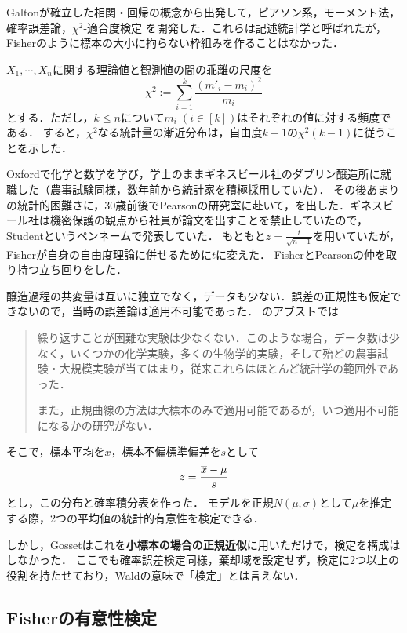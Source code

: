 \documentclass[uplatex,dvipdfmx]{jsreport}
\begin{document}
\begin{history}
    Galtonが確立した相関・回帰の概念から出発して，ピアソン系，モーメント法，確率誤差論，$\chi^2$-適合度検定
    を開発した．これらは記述統計学と呼ばれたが，Fisherのように標本の大小に拘らない枠組みを作ることはなかった．

    $X_1,\cdots,X_n$に関する理論値と観測値の間の乖離の尺度を
    \[\chi^2:=\sum^k_{i=1}\frac{(m'_i-m_i)^2}{m_i}\]
    とする．ただし，$k\le n$について$m_i\;(i\in[k])$はそれぞれの値に対する頻度である．
    すると，$\chi^2$なる統計量の漸近分布は，自由度$k-1$の$\chi^2(k-1)$に従うことを示した\cite{Pearson00}．
\end{history}

\begin{history}
    Oxfordで化学と数学を学び，学士のままギネスビール社のダブリン醸造所に就職した（農事試験同様，数年前から統計家を積極採用していた）．
    その後あまりの統計的困難さに，30歳前後でPearsonの研究室に赴いて，\cite{Gosset08}を出した．ギネスビール社は機密保護の観点から社員が論文を出すことを禁止していたので，Studentというペンネームで発表していた．
    もともと$z=\frac{t}{\sqrt{n-1}}$を用いていたが，Fisherが自身の自由度理論に併せるために$t$に変えた．
    FisherとPearsonの仲を取り持つ立ち回りをした．

    醸造過程の共変量は互いに独立でなく，データも少ない．誤差の正規性も仮定できないので，当時の誤差論は適用不可能であった．
    \cite{Gosset08}のアブストでは
    \begin{quote}
        繰り返すことが困難な実験は少なくない．このような場合，データ数は少なく，いくつかの化学実験，多くの生物学的実験，そして殆どの農事試験・大規模実験が当てはまり，従来これらはほとんど統計学の範囲外であった．

        また，正規曲線の方法は大標本のみで適用可能であるが，いつ適用不可能になるかの研究がない．
    \end{quote}
    そこで，標本平均を$x$，標本不偏標準偏差を$s$として
    \[z=\frac{\overline{x}-\mu}{s}\]
    とし，この分布と確率積分表を作った．
    モデルを正規$N(\mu,\sigma)$として$\mu$を推定する際，2つの平均値の統計的有意性を検定できる．

    しかし，Gossetはこれを\textbf{小標本の場合の正規近似}に用いただけで，検定を構成はしなかった．
    ここでも確率誤差検定同様，棄却域を設定せず，検定に2つ以上の役割を持たせており，Waldの意味で「検定」とは言えない．
\end{history}

\subsection{Fisherの有意性検定}
\end{document}
